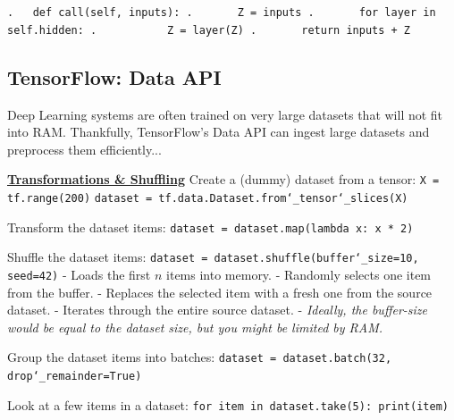 \texttt{.~~~def call(self, inputs):\newline
.~~~~~~~Z = inputs\newline
.~~~~~~~for layer in self.hidden:\newline
.~~~~~~~~~~~Z = layer(Z)\newline
.~~~~~~~return inputs + Z}

\newpage
\subsection{TensorFlow: Data API}

Deep Learning systems are often trained on very large datasets that will not fit into RAM.\newline
Thankfully, TensorFlow's Data API can ingest large datasets and preprocess them efficiently...\newline

\textbf{\underline{Transformations \& Shuffling}}\newline
Create a (dummy) dataset from a tensor:\newline
\texttt{X = tf.range(200)}\newline
\texttt{dataset = tf.data.Dataset.from\char`_tensor\char`_slices(X)}

Transform the dataset items:\newline
\texttt{dataset = dataset.map(lambda x:~x * 2)}

Shuffle the dataset items:\newline
\texttt{dataset = dataset.shuffle(buffer\char`_size=10, seed=42)}\newline
- Loads the first $n$ items into memory.\newline
- Randomly selects one item from the buffer.\newline
- Replaces the selected item with a fresh one from the source dataset.\newline
- Iterates through the entire source dataset.\newline
- \textit{Ideally, the buffer-size would be equal to the dataset size, but you might be limited by RAM.}

Group the dataset items into batches:\newline
\texttt{dataset = dataset.batch(32, drop\char`_remainder=True)}

Look at a few items in a dataset:\newline
\texttt{for item in dataset.take(5):~print(item)}\newline

